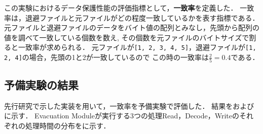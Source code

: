 この実験におけるデータ保護性能の評価指標として，\textbf{一致率}を定義した．
一致率は，退避ファイルと元ファイルがどの程度一致しているかを表す指標である．
元ファイルと退避ファイルのデータをバイト値の配列とみなし，先頭から配列の値を調べて一致している個数を数え,
その個数を元ファイルのバイトサイズで割ると一致率が求められる．
元ファイルが\texttt{[1, 2, 3, 4, 5]}，退避ファイルが\texttt{[1, 2, 4]}の場合，先頭の1と2が一致しているので
この時の一致率は$\frac{2}{5}=0.4$である．

\subsection{予備実験の結果}
\label{subsec:preliminary-result}
先行研究\cite{css2024}で示した実装を用いて，一致率を予備実験で評価した．
結果をおよびに示す．
Evacuation Moduleが実行する3つの処理Read，Decode，Writeのそれぞれの処理時間の分布をに示す．
